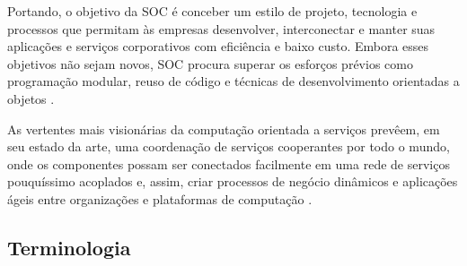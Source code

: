Portando, o objetivo da SOC é conceber um estilo de projeto, tecnologia e
processos que permitam às empresas desenvolver, interconectar e manter suas
aplicações e serviços corporativos com eficiência e baixo custo. Embora esses
objetivos não sejam novos, SOC procura superar os esforços prévios como
programação modular, reuso de código e técnicas de desenvolvimento orientadas a
objetos \cite{papazoglou2007serviceApprTechRechIss}.

As vertentes mais visionárias da computação orientada a serviços prevêem, em seu
estado da arte, uma coordenação de serviços cooperantes por todo o mundo, onde
os componentes possam ser conectados facilmente em uma rede de serviços pouquíssimo acoplados e, assim, criar
processos de negócio dinâmicos e aplicações ágeis entre organizações e plataformas de
computação \cite{leymann2005combining}.


\subsection{Terminologia}
\vspace{-6mm}

